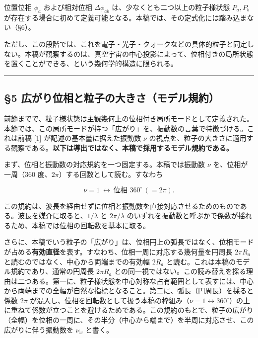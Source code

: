 \documentclass[
]{ltjsarticle}
\begin{document}
位置位相 \(\phi_a\) および相対位相 \(\Delta\phi_{ab}\)
は、少なくとも二つ以上の粒子様状態 \(P_a,P_b\)
が存在する場合に初めて定義可能となる。本稿では、その定式化には踏み込まない（§6）。

ただし、この段階では、これを電子・光子・クォークなどの具体的粒子と同定しない。本稿が観察するのは、真空宇宙の中心投影によって、位相付きの局所状態を置くことができる、という幾何学的構造に限られる。

\begin{center}\rule{0.5\linewidth}{0.5pt}\end{center}

\subsection{§5
広がり位相と粒子の大きさ（モデル規約）}\label{ux5e83ux304cux308aux4f4dux76f8ux3068ux7c92ux5b50ux306eux5927ux304dux3055ux30e2ux30c7ux30ebux898fux7d04}

前節までで、粒子様状態は主観幾何上の位相付き局所モードとして定義された。本節では、この局所モードが持つ「広がり」を、振動数の言葉で特徴づける。これは前稿
{[}1{]} が記述の基本量に据えた振動数 \(\nu\)
の視点を、粒子の大きさに適用する観察である。\textbf{以下は導出ではなく、本稿で採用するモデル規約である。}

まず、位相と振動数の対応規約を一つ固定する。本稿では振動数 \(\nu\)
を、位相が一周（360 度、\(2\pi\)）する回数として読む。すなわち

\[\nu=1\ \longleftrightarrow\ \text{位相 }360^\circ\,(=2\pi).\]

この規約は、波長を経由せずに位相と振動数を直接対応させるためのものである。波長を媒介に取ると、\(1/\lambda\)
と \(2\pi/\lambda\)
のいずれを振動数と呼ぶかで係数が揺れるため、本稿では位相の回転数を基本に取る。

さらに、本稿でいう粒子の「広がり」は、位相円上の弧長ではなく、位相モードが占める\textbf{有効直径}を表す。すなわち、位相一周に対応する幾何量を円周長
\(2\pi R_a\) と読むのではなく、中心から両端までの有効幅 \(2R_a\)
と読む。これは本稿のモデル規約であり、通常の円周長 \(2\pi R_a\)
との同一視ではない。この読み替えを採る理由は二つある。第一に、粒子様状態を中心対称な占有範囲として表すには、中心から両端までの全幅が自然な指標となること。第二に、弧長（円周長）を採ると係数
\(2\pi\)
が混入し、位相を回転数として扱う本稿の枠組み（\(\nu=1\leftrightarrow360^\circ\)）の上に重ねて係数が立つことを避けるためである。この規約のもとで、粒子の広がり（全幅）を位相の一周に、その半分（中心から端まで）を半周に対応させ、この広がりに伴う振動数を
\(\nu_w\) と書く。
\end{document}
